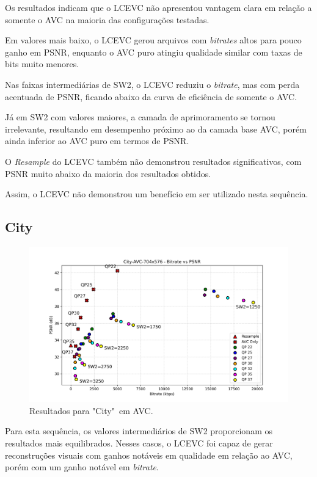 Os resultados indicam que o \acrshort{LCEVC} não apresentou vantagem clara em relação
a somente o \acrshort{AVC} na maioria das configurações testadas.

Em valores mais baixo, o \acrshort{LCEVC} gerou arquivos com \textit{bitrates} altos
para pouco ganho em \acrshort{PSNR}, enquanto o \acrshort{AVC} puro atingiu qualidade
similar com taxas de bits muito menores.

Nas faixas intermediárias de SW2, o \acrshort{LCEVC} reduziu o \textit{bitrate}, mas
com perda acentuada de \acrshort{PSNR}, ficando abaixo da curva de eficiência de somente
o \acrshort{AVC}.

Já em SW2 com valores maiores, a camada de aprimoramento se tornou irrelevante, resultando em
desempenho próximo ao da camada base \acrshort{AVC}, porém ainda inferior ao \acrshort{AVC} puro
em termos de \acrshort{PSNR}.

O \textit{Resample} do \acrshort{LCEVC} também não demonstrou resultados significativos, com 
\acrshort{PSNR} muito abaixo da maioria dos resultados obtidos. 

Assim, o \acrshort{LCEVC} não demonstrou um benefício em ser utilizado nesta sequência.

\newpage
\subsection{City}

\begin{figure}[h]
    \centering
    \includegraphics[width=1.0\textwidth]{img/City-AVC.png}
    \caption{Resultados para "City"\ em \acrshort{AVC}. \cite{xiph}}
    \label{fig:City}
\end{figure}

Para esta sequência, os valores intermediários de SW2 proporcionam os resultados mais equilibrados.
Nesses casos, o \acrshort{LCEVC} foi capaz de gerar reconstruções visuais com ganhos notáveis
em qualidade em relação ao \acrshort{AVC}, porém com um ganho notável em \textit{bitrate}.

